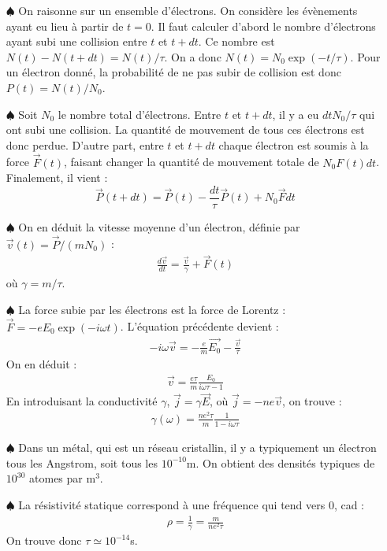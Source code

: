 \documentclass{report}
\begin{document}
\begin{itemize}
	
	\item[$\spadesuit$] On raisonne sur un ensemble d'électrons. On considère les évènements ayant eu lieu à partir de $t=0$. Il faut calculer d'abord le nombre d'électrons ayant subi une collision entre $t$ et $t+dt$. Ce nombre est $N(t)-N(t+dt)=N(t)/\tau$. On a donc $N(t)=N_0\exp(-t/\tau)$. Pour un électron donné, la probabilité de ne pas subir de collision est donc $P(t)=N(t)/N_0$. 
	
	\item[$\spadesuit$] Soit $N_0$ le nombre total d'électrons. Entre $t$ et $t+dt$, il y a eu $dtN_0/\tau$ qui ont subi une collision. La quantité de mouvement de tous ces électrons est donc perdue. D'autre part, entre $t$ et $t+dt$ chaque électron est soumis à la force $\vec{F}(t)$, faisant changer la quantité de mouvement totale de $N_0F(t)dt$. Finalement, il vient :
	\begin{equation}
		\vec{P}(t+dt)=\vec{P}(t)-\frac{dt}{\tau}\vec{P}(t)+N_0\vec{F}dt
	\end{equation}
	
	\item[$\spadesuit$] On en déduit la vitesse moyenne d'un électron, définie par $\vec{v}(t)=\vec{P}/(mN_0)$ :
	\begin{align*}
		\frac{d\vec{v}}{dt}=\frac{\vec{v}}{\gamma}+\vec{F}(t)
	\end{align*}
	où $\gamma=m/\tau$.
	
	\item[$\spadesuit$] La force subie par les électrons est la force de Lorentz : $\vec{F}=-eE_0\exp(-i\omega t)$. L'équation précédente devient :
	\begin{align*}
		-i\omega\vec{v}=-\frac{e}{m}\vec{E_0}-\frac{\vec{v}}{\tau}
	\end{align*}
	On en déduit :
	\begin{align*}
		\vec{v}=\frac{e\tau}{m}\frac{E_0}{i\omega\tau-1}
	\end{align*}
	En introduisant la conductivité $\gamma$, $\vec{j}=\gamma \vec{E}$, où $\vec{j}=-ne\vec{v}$, on trouve :
	\begin{align*}
		\gamma(\omega)=\frac{ne^2\tau}{m}\frac{1}{1-i\omega\tau}
	\end{align*}
	
	\item[$\spadesuit$] Dans un métal, qui est un réseau cristallin, il y a typiquement un électron tous les Angstrom, soit tous les $10^{-10}$m. On obtient des densités typiques de $10^{30}$ atomes par m$^3$.
	
	\item[$\spadesuit$] La résistivité statique correspond à une fréquence qui tend vers 0, cad :
	\begin{align*}
		\rho = \frac{1}{\gamma}=\frac{m}{ne^2\tau}
	\end{align*}
	On trouve donc $\tau\simeq10^{-14}$s.
	
\end{itemize}
\end{document}
